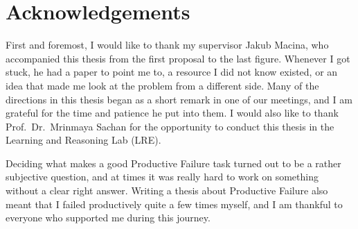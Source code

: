 \newpage

\chapter*{Acknowledgements}
First and foremost, I would like to thank my supervisor Jakub Macina, who accompanied this thesis from the first proposal to the last figure. Whenever I got stuck, he had a paper to point me to, a resource I did not know existed, or an idea that made me look at the problem from a different side. Many of the directions in this thesis began as a short remark in one of our meetings, and I am grateful for the time and patience he put into them. I would also like to thank Prof.~Dr.~Mrinmaya Sachan for the opportunity to conduct this thesis in the Learning and Reasoning Lab (LRE).

Deciding what makes a good Productive Failure task turned out to be a rather subjective question, and at times it was really hard to work on something without a clear right answer. Writing a thesis about Productive Failure also meant that I failed productively quite a few times myself, and I am thankful to everyone who supported me during this journey.
